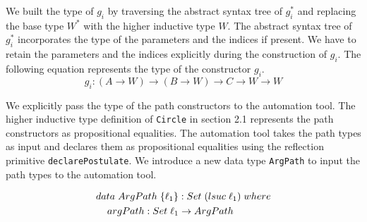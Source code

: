 \documentclass[sigplan,10pt]{acmart}
\begin{document}
We built the type of $g_i$ by traversing the abstract syntax tree of $g_i^*$ and replacing the base type $W^*$ with the higher inductive type $W$. The abstract syntax tree of $g_i^*$ incorporates the type of the parameters and the indices if present. We have to retain the parameters and the indices explicitly during the construction of $g_i$. The following equation  represents the type of the constructor $g_i$.
\begin{equation}
g_i : (A \rightarrow W) \rightarrow (B \rightarrow W) \rightarrow C \rightarrow W \rightarrow W \nonumber
\end{equation}

We explicitly pass the type of the path constructors to the automation tool. The higher inductive type definition of {\tt Circle} in section 2.1 represents the path constructors as propositional equalities. The automation tool takes the path types as input and declares them as propositional equalities using the reflection primitive {\tt declarePostulate}. We introduce a new data type {\tt ArgPath} to input the path types to the automation tool.
\begin{center}
\begingroup
\fontsize{7.9pt}{0pt}\selectfont
\begin{align}
& data \hspace {0.1cm} ArgPath \hspace {0.1cm} \{\ell_1\} : Set \hspace {0.1cm} (lsuc \hspace {0.1cm} \ell_1) \hspace {0.1cm} where \nonumber \\
& \hspace {0.4cm} argPath : Set \hspace {0.1cm} \ell_1 \rightarrow ArgPath \nonumber \\ \nonumber
\end{align}
\endgroup
\end{center}
\normalsize
\end{document}
